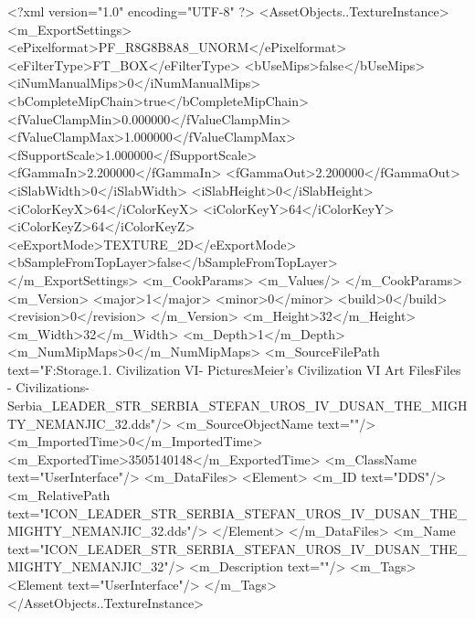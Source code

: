 <?xml version="1.0" encoding="UTF-8" ?>
<AssetObjects..TextureInstance>
	<m_ExportSettings>
		<ePixelformat>PF_R8G8B8A8_UNORM</ePixelformat>
		<eFilterType>FT_BOX</eFilterType>
		<bUseMips>false</bUseMips>
		<iNumManualMips>0</iNumManualMips>
		<bCompleteMipChain>true</bCompleteMipChain>
		<fValueClampMin>0.000000</fValueClampMin>
		<fValueClampMax>1.000000</fValueClampMax>
		<fSupportScale>1.000000</fSupportScale>
		<fGammaIn>2.200000</fGammaIn>
		<fGammaOut>2.200000</fGammaOut>
		<iSlabWidth>0</iSlabWidth>
		<iSlabHeight>0</iSlabHeight>
		<iColorKeyX>64</iColorKeyX>
		<iColorKeyY>64</iColorKeyY>
		<iColorKeyZ>64</iColorKeyZ>
		<eExportMode>TEXTURE_2D</eExportMode>
		<bSampleFromTopLayer>false</bSampleFromTopLayer>
	</m_ExportSettings>
	<m_CookParams>
		<m_Values/>
	</m_CookParams>
	<m_Version>
		<major>1</major>
		<minor>0</minor>
		<build>0</build>
		<revision>0</revision>
	</m_Version>
	<m_Height>32</m_Height>
	<m_Width>32</m_Width>
	<m_Depth>1</m_Depth>
	<m_NumMipMaps>0</m_NumMipMaps>
	<m_SourceFilePath text="F:\Mod Storage\2.1. Civilization VI\Mods\Archive - Pictures\Sid Meier's Civilization VI Art Files\Art Files - Civilizations\Civilization - Serbia\ICON_LEADER_STR_SERBIA_STEFAN_UROS_IV_DUSAN_THE_MIGHTY_NEMANJIC_32.dds"/>
	<m_SourceObjectName text=""/>
	<m_ImportedTime>0</m_ImportedTime>
	<m_ExportedTime>3505140148</m_ExportedTime>
	<m_ClassName text="UserInterface"/>
	<m_DataFiles>
		<Element>
			<m_ID text="DDS"/>
			<m_RelativePath text="ICON_LEADER_STR_SERBIA_STEFAN_UROS_IV_DUSAN_THE_MIGHTY_NEMANJIC_32.dds"/>
		</Element>
	</m_DataFiles>
	<m_Name text="ICON_LEADER_STR_SERBIA_STEFAN_UROS_IV_DUSAN_THE_MIGHTY_NEMANJIC_32"/>
	<m_Description text=""/>
	<m_Tags>
		<Element text="UserInterface"/>
	</m_Tags>
</AssetObjects..TextureInstance>

